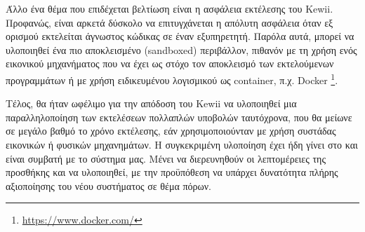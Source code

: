 \documentclass[diploma]{softlab-thesis}
\begin{document}
\bigskip

Άλλο ένα θέμα που επιδέχεται βελτίωση είναι η ασφάλεια εκτέλεσης του Kewii.
Προφανώς, είναι αρκετά δύσκολο να επιτυγχάνεται η απόλυτη ασφάλεια όταν εξ
ορισμού εκτελείται άγνωστος κώδικας σε έναν εξυπηρετητή. Παρόλα αυτά, μπορεί να
υλοποιηθεί ένα πιο αποκλεισμένο (sandboxed) περιβάλλον, πιθανόν με τη χρήση
ενός εικονικού μηχανήματος που να έχει ως στόχο τον αποκλεισμό των εκτελούμενων
προγραμμάτων ή με χρήση ειδικευμένου λογισμικού ως container, π.χ. Docker
\footnote{\url{https://www.docker.com/}}.

\bigskip

Τέλος, θα ήταν ωφέλιμο για την απόδοση του Kewii να υλοποιηθεί μια παραλληλοποίηση
των εκτελέσεων πολλαπλών υποβολών ταυτόχρονα, που θα μείωνε σε μεγάλο βαθμό το
χρόνο εκτέλεσης, εάν χρησιμοποιούνταν με χρήση συστάδας εικονικών ή φυσικών
μηχανημάτων. Η συγκεκριμένη υλοποίηση έχει ήδη γίνει στο \cite{Tsiamitros} και
είναι συμβατή με το σύστημα μας. Μένει να διερευνηθούν οι λεπτομέρειες της
προσθήκης και να υλοποιηθεί, με την προϋπόθεση να υπάρχει δυνατότητα πλήρης
αξιοποίησης του νέου συστήματος σε θέμα πόρων.





\end{document}
